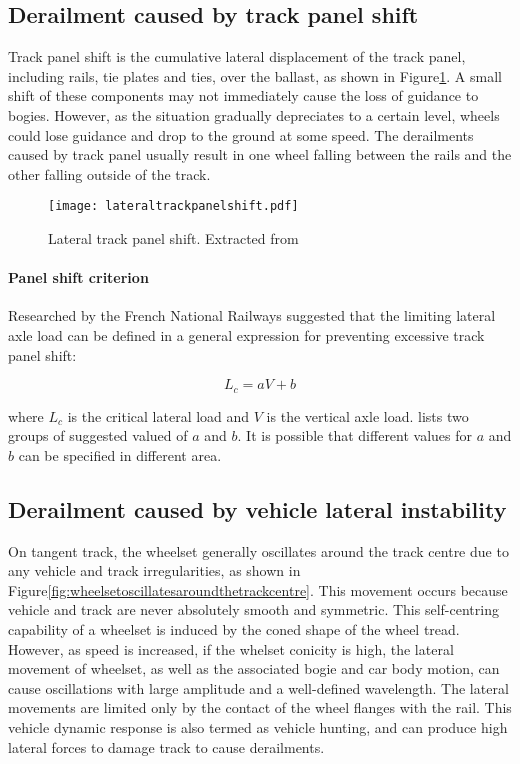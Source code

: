 \subsection{Derailment caused by track panel shift}
Track panel shift is the cumulative lateral displacement of the track panel, including rails, tie plates and ties, over the ballast, as shown in Figure\ref{fig:lateraltrackpanelshift}. A small shift of these components may not immediately cause the loss of guidance to bogies. However, as the situation gradually depreciates to a certain level, wheels could lose guidance and drop to the ground at some speed. The derailments caused by track panel usually result in one wheel falling between the rails and the other falling outside of the track.

\begin{figure}[h]
    \centering
    \texttt{[image: lateraltrackpanelshift.pdf]}
    \caption{Lateral track panel shift. Extracted from \citet[Figure8.27]{iwnicki2006handbook}}
    \label{fig:lateraltrackpanelshift}
\end{figure}

\paragraph{Panel shift criterion}
Researched by the French National Railways suggested that the limiting lateral axle load can be defined in a general expression for preventing excessive track panel shift:

\begin{equation}
    L_c = aV+b
\end{equation}

where $L_c$ is the critical lateral load and $V$ is the vertical axle load. \citet[Table 8.2]{iwnicki2006handbook} lists two groups of suggested valued of $a$ and $b$. It is possible that different values for $a$ and $b$ can be specified in different area.

\subsection{Derailment caused by vehicle lateral instability}
On tangent track, the wheelset generally oscillates around the track centre due to any vehicle and track irregularities, as shown in Figure\ref{fig:wheelsetoscillatesaroundthetrackcentre}. This movement occurs because vehicle and track are never absolutely smooth and symmetric. This self-centring capability of a wheelset is induced by the coned shape of the wheel tread. However, as speed is increased, if the whelset conicity is high, the lateral movement of wheelset, as well as the associated bogie and car body motion, can cause oscillations with large amplitude  and a well-defined wavelength. The lateral movements are limited only by the contact of the wheel flanges with the rail. This vehicle dynamic response is also termed as vehicle hunting, and can produce high lateral forces to damage track to cause derailments.

